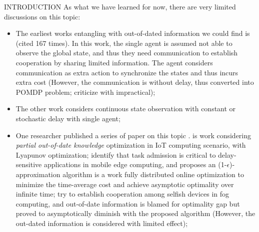 \documentclass[10pt, conference, letterpaper]{IEEEtran}
\begin{document}
\begin{section}{INTRODUCTION}
        As what we have learned for now, there are very limited discussions on this topic:
        \begin{itemize}
            \item The earliest works entangling with out-of-dated information we could find is \cite{ref-01} (cited 167 times). In this work, the single agent is assumed not able to observe the global state, and thus they need communication to establish cooperation by sharing limited information. The agent considers communication as extra action to synchronize the states and thus incurs extra cost (However, the communication is without delay, thus converted into POMDP problem; criticize with impractical);
            \item The other work \cite{ref-02} considers continuous state observation with constant or stochastic delay with single agent;
            \item One researcher published a series of paper on this topic \cite{Lyu2017,Lyu2018,Lyu2018a,Lyu2018b}.
                \cite{Lyu2017} is work considering \emph{partial out-of-date knowledge} optimization in IoT computing scenario, with Lyapunov optimization;
                 \cite{Lyu2018} identify that task admission is critical to delay-sensitive applications in mobile edge computing, and proposes an (1-$\epsilon$)-approximation algorithm
                 \cite{Lyu2018a} is a work fully distributed online optimization to minimize the time-average cost and achieve asymptotic optimality over infinite time;
                \cite{Lyu2018b} try to establish cooperation among selfish devices in fog computing, and out-of-date information is blamed for optimality gap but proved to asymptotically diminish with the proposed algorithm (However, the out-dated information is considered with limited effect);
        \end{itemize}


\end{section}
\end{document}
